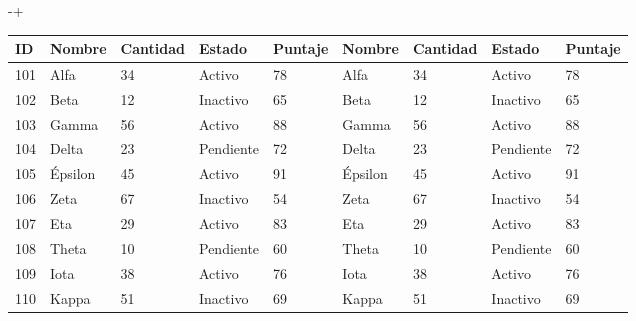 \documentclass{article}
\begin{document}
\begin{adjustwidth}{0pt}{-\dimexpr\marginparsep+\marginparwidth\relax}%
\centering
{\sf\footnotesize\setlength\tabcolsep{4pt}%
  \begin{tabular}{@{}lllllllll@{}}
    \toprule
    \textbf{ID} & \textbf{Nombre} & \textbf{Cantidad} & \textbf{Estado} & \textbf{Puntaje} & \textbf{Nombre} & \textbf{Cantidad} & \textbf{Estado} & \textbf{Puntaje} \\
    \midrule
    101 & Alfa & 34 & Activo & 78 & Alfa & 34 & Activo & 78 \\
    \midrule
    102 & Beta & 12 & Inactivo & 65 & Beta & 12 & Inactivo & 65 \\
    \midrule
    103 & Gamma & 56 & Activo & 88 & Gamma & 56 & Activo & 88 \\
    \midrule
    104 & Delta & 23 & Pendiente & 72 & Delta & 23 & Pendiente & 72 \\
    \midrule
    105 & Épsilon & 45 & Activo & 91 & Épsilon & 45 & Activo & 91 \\
    \midrule
    106 & Zeta & 67 & Inactivo & 54 & Zeta & 67 & Inactivo & 54 \\
    \midrule
    107 & Eta & 29 & Activo & 83 & Eta & 29 & Activo & 83 \\
    \midrule
    108 & Theta & 10 & Pendiente & 60 & Theta & 10 & Pendiente & 60 \\
    \midrule
    109 & Iota & 38 & Activo & 76 & Iota & 38 & Activo & 76 \\
    \midrule
    110 & Kappa & 51 & Inactivo & 69 & Kappa & 51 & Inactivo & 69 \\
    \bottomrule
  \end{tabular}
}%
\label{tbl-ancho}
\vspace{\intextsep}
\end{adjustwidth}
\end{document}
